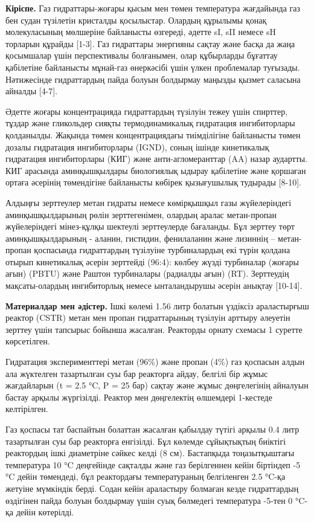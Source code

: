 \begin{multicols}{2}
{\bfseries Кіріспе.} Газ гидраттары-жоғары қысым мен төмен температура
жағдайында газ бен судан түзілетін кристалды қосылыстар. Олардың
құрылымы қонақ молекуласының мөлшеріне байланысты өзгереді, әдетте sI,
sII немесе sH торларын құрайды {[}1-3{]}. Газ гидраттары энергияны
сақтау және басқа да жаңа қосымшалар үшін перспективалы болғанымен, олар
құбырларды бұғаттау қабілетіне байланысты мұнай-газ өнеркәсібі үшін
үлкен проблемалар туғызады. Нәтижесінде гидраттардың пайда болуын
болдырмау маңызды қызмет саласына айналды {[}4-7{]}.

Әдетте жоғары концентрацияда гидраттардың түзілуін тежеу үшін спирттер,
тұздар және гликольдер сияқты термодинамикалық гидратация ингибиторлары
қолданылды. Жақында төмен концентрациядағы тиімділігіне байланысты төмен
дозалы гидратация ингибиторлары (IGND), соның ішінде кинетикалық
гидратация ингибиторлары (КИГ) және анти-агломеранттар (AA) назар
аудартты. КИГ арасында аминқышқылдары биологиялық ыдырау қабілетіне және
қоршаған ортаға әсерінің төмендігіне байланысты көбірек қызығушылық
тудырады {[}8-10{]}.

Алдыңғы зерттеулер метан гидраты немесе көмірқышқыл газы жүйелеріндегі
аминқышқылдарының рөлін зерттегенімен, олардың аралас метан-пропан
жүйелеріндегі мінез-құлқы шектеулі зерттеулерде бағаланды. Бұл зерттеу
төрт аминқышқылдарының - аланин, гистидин, фенилаланин және лизиннің --
метан-пропан қоспасында гидраттардың түзілуіне турбиналардың екі түрін
қолдана отырып кинетикалық әсерін зерттейді (96:4): көлбеу жүзді
турбиналар (жоғары ағын) (PBTU) және Раштон турбиналары (радиалды ағын)
(RT). Зерттеудің мақсаты-олардың ингибиторлық немесе ынталандырушы
әсерін анықтау {[}10-14{]}.

{\bfseries Материалдар мен әдістер.} Ішкі көлемі 1.56 литр болатын үздіксіз
араластырғыш реактор (CSTR) метан мен пропан гидраттарының түзілуін
арттыру әлеуетін зерттеу үшін тапсырыс бойынша жасалған. Реакторды
орнату схемасы 1 суретте көрсетілген.
\end{multicols}


\begin{multicols}{2}
Гидратация эксперименттері метан (96\%) және пропан (4\%) газ қоспасын
алдын ала жүктелген тазартылған суы бар реакторға айдау, белгілі бір
жұмыс жағдайларын (t = 2.5 °C, P = 25 бар) сақтау және жұмыс
дөңгелегінің айналуын бастау арқылы жүргізілді. Реактор мен дөңгелектің
өлшемдері 1-кестеде келтірілген.

Газ қоспасы тат баспайтын болаттан жасалған қабылдау түтігі арқылы 0.4
литр тазартылған суы бар реакторға енгізілді. Бұл көлемде сұйықтықтың
биіктігі реактордың ішкі диаметріне сәйкес келді (8 см). Бастапқыда
тоңазытқыштағы температура 10 °C деңгейінде сақталды және газ
берілгеннен кейін біртіндеп -5 °C дейін төмендеді, бұл реактордағы
температураның белгіленген 2.5 °C-қа жетуіне мүмкіндік берді. Содан
кейін араластыру болмаған кезде гидраттардың өздігінен пайда болуын
болдырмау үшін суық бөлмедегі температура -5-тен 0 °C-қа дейін
көтерілді.
\end{multicols}

